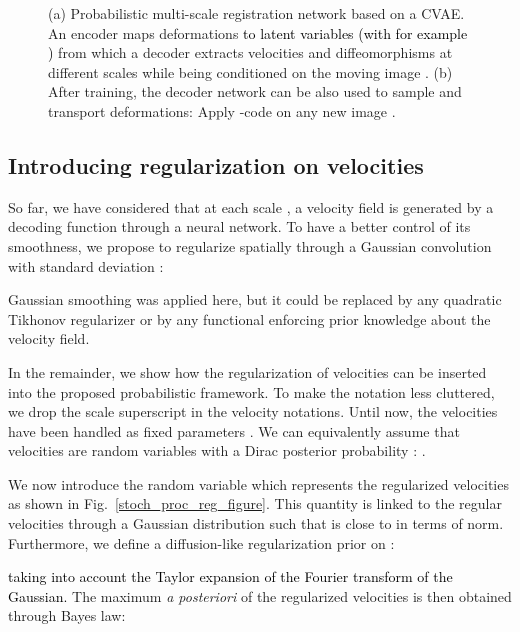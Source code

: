 \documentclass[journal]{IEEEtran}
\newcommand{\update}[1]{\textcolor{black}{#1}}
\begin{document}
\begin{figure*}[tb]
\centering 
{}\hfill
{}
\caption{\small{(a) Probabilistic multi-scale registration network based on a CVAE. An encoder maps deformations \update{to latent variables  (with for example )} from which a decoder extracts velocities and diffeomorphisms at different scales while being conditioned on the moving image . (b) After training, the decoder network can be also used to sample and transport deformations: Apply -code on any new image . 
}}
\end{figure*}

\subsection{Introducing regularization on velocities}
So far, we have considered that at each scale , a velocity field  is generated by a decoding function  through a neural network. To have a better control of its smoothness, we propose to regularize spatially  through a Gaussian convolution with standard deviation : 


Gaussian smoothing  was applied here, but it could be replaced by any quadratic Tikhonov regularizer or by any  functional enforcing prior knowledge about the velocity field.

In the remainder, we show how the regularization of velocities can be inserted into the proposed probabilistic framework.  To make the notation less cluttered, we drop the scale  superscript in the velocity notations.  Until now, the velocities  have been handled as fixed parameters . We can equivalently assume that velocities  are random variables with a Dirac posterior probability : . 

We now introduce the random variable  which represents the regularized velocities as shown in Fig.~\ref{stoch_proc_reg_figure}. This quantity is linked to  the  regular velocities  through a Gaussian distribution  such that  is close to  in terms of  norm. Furthermore, we define a  diffusion-like regularization prior on  \cite{nielsen1997regularization}:

\update{taking into account the Taylor expansion of the Fourier transform of the Gaussian.} The maximum {\em a posteriori} of the regularized velocities   is then obtained through Bayes law:
\end{document}
